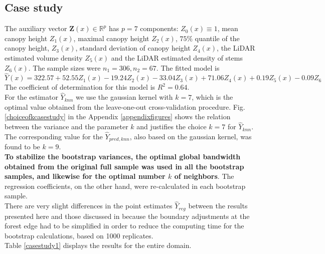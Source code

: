 \documentclass[a4paper,12pt,leqno, titlepage]{article}
\newcommand{\R}{\mathbb{R}}
\begin{document}
 \subsection{Case study}\label{casestudy}

  The auxiliary vector $\pmb{Z}(x)\in{\R^p}$ has $p=7$ components: $Z_0(x)\equiv 1$, mean canopy height $Z_1(x)$, maximal canopy height $Z_2(x)$, $75\%$ quantile of the canopy height, $Z_3(x)$, standard deviation of canopy height $Z_4(x)$, the LiDAR estimated volume density $Z_5(x)$ and the LiDAR estimated density of stems $Z_6(x)$. The sample sizes were $n_1=306,n_2=67$. The fitted model is
 \begin{equation*}
 \hat{Y}(x)=322.57 + 52.55Z_1(x) -19.24Z_2(x) -33.04Z_3(x)+71.06Z_4(x) +0.19Z_5(x)-0.09Z_6
 \end{equation*}
 The coefficient of determination for this model is $R^2=0.64$. \\
 For the estimator $\hat{Y}_{knn}$ we use the gaussian kernel with $k=7$, which is the optimal value obtained from the leave-one-out cross-validation procedure. Fig. \ref{choiceofkcasestudy} in the Appendix \ref{appendixfigures} shows the relation between the variance and the parameter $k$ and justifies the choice $k=7$ for $\hat{Y}_{knn}$. The corresponding value for the $\hat{Y}_{pred,knn}$, also based on the gaussian kernel, was found to be $k=9$.\\
 \textbf{To stabilize the bootstrap variances, the optimal global bandwidth obtained from the original full sample was used in all the bootstrap samples, and likewise for the optimal number $k$ of neighbors}. The regression coefficients, on the other hand, were re-calculated in each bootstrap sample.\\
 There are very slight differences in the point estimates $\hat{Y}_{reg}$  between the results presented here and those discussed in \cite{mandallaz4} because the boundary adjustments at the forest edge had to be simplified in order to reduce the computing time for the bootstrap calculations, based on 1000 replicates.\\
\noindent
 Table \ref{casestudy1} displays the results for the entire domain.
 \clearpage\newpage
\end{document}
